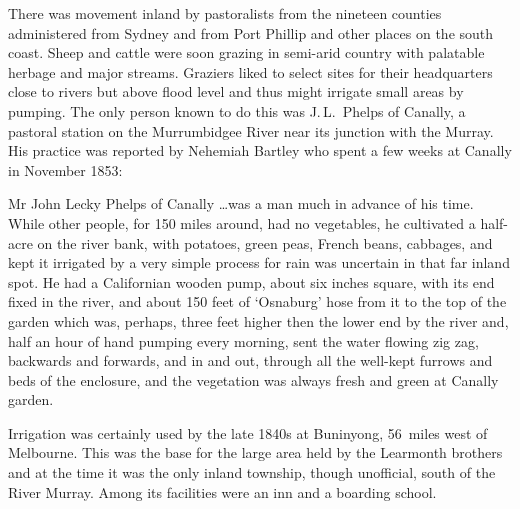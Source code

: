 There was movement inland by pastoralists from the nineteen counties
administered from Sydney  and from Port Phillip
 and other places on the south coast.  Sheep
and cattle were soon grazing in semi-arid country with palatable
herbage and major streams.  Graziers liked to select sites for their
headquarters close to rivers but above flood level and
thus might irrigate small areas by pumping.  The only person known to
do this was J.\,L.~Phelps  of Canally,
 a pastoral station on the Murrumbidgee River
 near its junction with the
Murray.  His practice was reported by Nehemiah
Bartley  who spent a few weeks at Canally in
November 1853:
\begin{Quote}
	Mr John Lecky Phelps of Canally \ldots was a man much in
	advance of his time.  While other people, for 150 miles
	around, had no vegetables, he cultivated a half-acre on the
	river bank, with potatoes, green peas, French beans, cabbages,
	and kept it irrigated by a very simple process for rain was
	uncertain in that far inland spot.  He had a Californian
	wooden pump,
	about six inches square, with its end fixed in the river, and
	about 150 feet of `Osnaburg' hose from it to the top of the
	garden which was, perhaps, three feet higher then the lower
	end by the river and, half an hour of hand pumping every
	morning, sent the water flowing zig zag, backwards and
	forwards, and in and out, through all the well-kept furrows
	and beds of the enclosure, and the vegetation was always fresh
	and green at Canally
	garden.
\end{Quote}

Irrigation was certainly used by the late 1840s at Buninyong,
 56~miles
west of Melbourne.  This was the base for the large area held by the
Learmonth brothers  and at the time it was the
only inland township, though unofficial, south of the River Murray.
Among its facilities were an inn and a boarding school.

